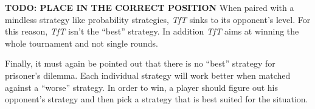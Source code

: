 \documentclass[journal,a4paper,10pt,twoside]{IEEEtran} %
\begin{document}
\textbf{TODO: PLACE IN THE CORRECT POSITION}
When paired with a mindless strategy like probability strategies, \textit{TfT} sinks to its opponent's level. For this reason, \textit{TfT} isn't the ``best'' strategy. In addition \textit{TfT} aims at winning the whole tournament and not single rounds.

Finally, it must again be pointed out that there is no ``best'' strategy for prisoner's dilemma. Each individual strategy will work better when matched against a ``worse'' strategy. In order to win, a player should figure out his opponent's strategy and then pick a strategy that is best suited for the situation.

\balance



\onecolumn
{}\label{appendix}

\end{document}
